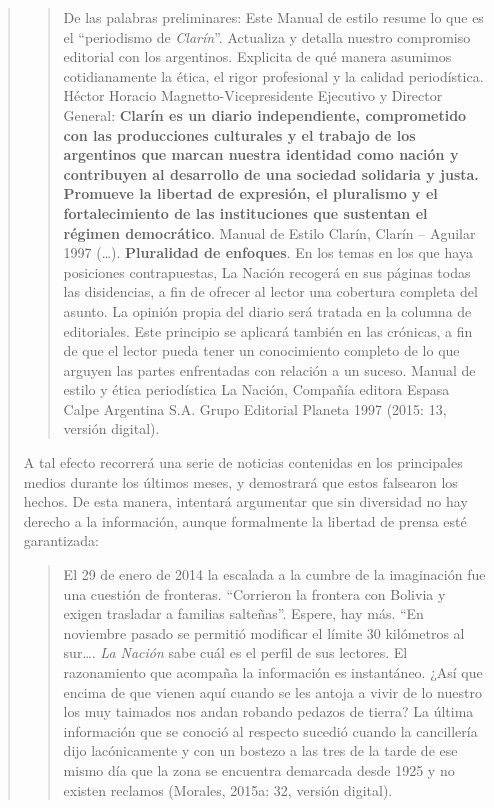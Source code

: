 \begin{quote}
\begin{quote}
	De las palabras preliminares: Este Manual de estilo resume lo que es el \enquote{periodismo de \emph{Clarín}}. Actualiza y detalla nuestro compromiso editorial con los argentinos. Explicita de qué manera asumimos cotidianamente la ética, el rigor profesional y la calidad periodística. Héctor Horacio Magnetto-Vicepresidente Ejecutivo y Director General: \textbf{Clarín es un diario independiente, comprometido con las producciones culturales y el trabajo de los argentinos que marcan nuestra identidad como nación y contribuyen al desarrollo de una sociedad solidaria y justa. Promueve la libertad de expresión, el pluralismo y el fortalecimiento de las instituciones que sustentan el régimen democrático}. Manual de Estilo Clarín, Clarín -- Aguilar 1997 (\dots). \textbf{Pluralidad de enfoques}. En los temas en los que haya posiciones contrapuestas, La Nación recogerá en sus páginas todas las disidencias, a fin de ofrecer al lector una cobertura completa del asunto. La opinión propia del diario será tratada en la columna de editoriales. Este principio se aplicará también en las crónicas, a fin de que el lector pueda tener un conocimiento completo de lo que arguyen las partes enfrentadas con relación a un suceso. Manual de estilo y ética periodística La Nación, Compañía editora Espasa Calpe Argentina S.A. Grupo Editorial Planeta 1997 (2015: 13, versión digital).
\end{quote}


A tal efecto recorrerá una serie de noticias contenidas en los principales medios durante los últimos meses, y demostrará que estos falsearon los hechos. De esta manera, intentará argumentar que sin diversidad no hay derecho a la información, aunque formalmente la libertad de prensa esté garantizada:

\begin{quote}
	El 29 de enero de 2014 la escalada a la cumbre de la imaginación fue una cuestión de fronteras. \enquote{Corrieron la frontera con Bolivia y exigen trasladar a familias salteñas}. Espere, hay más. ``En noviembre pasado se permitió modificar el límite 30 kilómetros al sur\dots. \emph{La Nación} sabe cuál es el perfil de sus lectores. El razonamiento que acompaña la información es instantáneo. ¿Así que encima de que vienen aquí cuando se les antoja a vivir de lo nuestro los muy taimados nos andan robando pedazos de tierra? La última información que se conoció al respecto sucedió cuando la cancillería dijo lacónicamente y con un bostezo a las tres de la tarde de ese mismo día que la zona se encuentra demarcada desde 1925 y no existen reclamos (Morales, 2015a: 32, versión digital).
\end{quote}



\end{quote}
